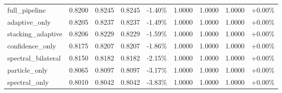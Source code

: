 \begin{table}[htbp]
\begin{adjustbox}{max width=\textwidth}
\begin{tabular}{l cccc cccc}
full\_pipeline & 0.8200 & 0.8245 & 0.8245 & -1.40\% & 1.0000 & 1.0000 & 1.0000 & +0.00\% \\
adaptive\_only & 0.8205 & 0.8237 & 0.8237 & -1.49\% & 1.0000 & 1.0000 & 1.0000 & +0.00\% \\
stacking\_adaptive & 0.8206 & 0.8229 & 0.8229 & -1.59\% & 1.0000 & 1.0000 & 1.0000 & +0.00\% \\
confidence\_only & 0.8175 & 0.8207 & 0.8207 & -1.86\% & 1.0000 & 1.0000 & 1.0000 & +0.00\% \\
spectral\_bilateral & 0.8150 & 0.8182 & 0.8182 & -2.15\% & 1.0000 & 1.0000 & 1.0000 & +0.00\% \\
particle\_only & 0.8065 & 0.8097 & 0.8097 & -3.17\% & 1.0000 & 1.0000 & 1.0000 & +0.00\% \\
spectral\_only & 0.8010 & 0.8042 & 0.8042 & -3.83\% & 1.0000 & 1.0000 & 1.0000 & +0.00\% \\
\bottomrule
\end{tabular}
\end{adjustbox}
\end{table}
